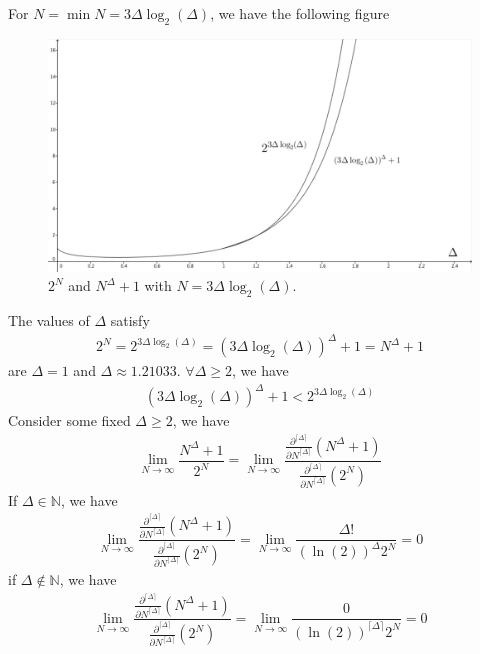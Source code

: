 \documentclass[12pt]{article}
\newcommand{\ParTh}[1]{\left(#1\right)}
\begin{document}
For $N=\min N=3\Delta\log_2\ParTh{\Delta}$, we have the following figure
\begin{figure}[H]
	\centering
	\includegraphics[scale=0.3]{21-3.png}
	\caption{$2^N$ and $N^\Delta+1$ with $N=3\Delta\log_2\ParTh{\Delta}$.}
\end{figure}
The values of $\Delta$ satisfy
\begin{align}
2^N=2^{3\Delta\log_2\ParTh{\Delta}}=\ParTh{3\Delta\log_2\ParTh{\Delta}}^\Delta+1=N^\Delta+1
\end{align}
are $\Delta=1$ and $\Delta\approx1.21033$. $\forall\Delta\geq2$, we have
\begin{align}
\ParTh{3\Delta\log_2\ParTh{\Delta}}^\Delta+1<2^{3\Delta\log_2\ParTh{\Delta}}
\end{align}
Consider some fixed $\Delta\geq2$, we have
\begin{align}
\lim\limits_{N\rightarrow\infty}\dfrac{N^\Delta+1}{2^N}=\lim\limits_{N\rightarrow\infty}\dfrac{\frac{\partial^{\lceil\Delta\rceil}}{\partial N^{\lceil\Delta\rceil}}\ParTh{N^\Delta+1}}{\frac{\partial^{\lceil\Delta\rceil}}{\partial N^{\lceil\Delta\rceil}}\ParTh{2^N}}
\end{align}
If $\Delta\in\mathbb{N}$, we have
\begin{align}
\lim\limits_{N\rightarrow\infty}\dfrac{\frac{\partial^{\lceil\Delta\rceil}}{\partial N^{\lceil\Delta\rceil}}\ParTh{N^\Delta+1}}{\frac{\partial^{\lceil\Delta\rceil}}{\partial N^{\lceil\Delta\rceil}}\ParTh{2^N}}=\lim\limits_{N\rightarrow\infty}\dfrac{\Delta!}{\ParTh{\ln\ParTh{2}}^\Delta2^N}=0
\end{align}
if $\Delta\notin\mathbb{N}$, we have
\begin{align}
\lim\limits_{N\rightarrow\infty}\dfrac{\frac{\partial^{\lceil\Delta\rceil}}{\partial N^{\lceil\Delta\rceil}}\ParTh{N^\Delta+1}}{\frac{\partial^{\lceil\Delta\rceil}}{\partial N^{\lceil\Delta\rceil}}\ParTh{2^N}}=\lim\limits_{N\rightarrow\infty}\dfrac{0}{\ParTh{\ln\ParTh{2}}^{\lceil\Delta\rceil}2^N}=0
\end{align}
\end{document}
